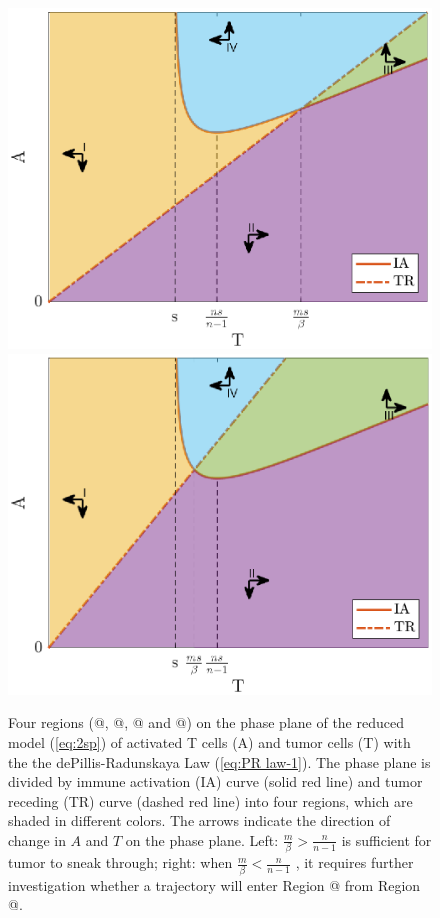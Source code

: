 \documentclass[review,authoryear]{elsarticle}
\makeatletter
\newcommand*{\rom}[1]{\expandafter\@slowromancap\romannumeral #1@}
\makeatother
\begin{document}
\begin{figure}
\centerline{\includegraphics[width=0.5\linewidth]{figs/dP-colored-regions-l}\includegraphics[width=0.5\linewidth]{figs/dP-colored-regions-r}}

\caption{\label{fig:dP-PP-4regions}
Four regions (\rom{1}, \rom{2}, \rom{3} and \rom{4}) on the phase plane of the reduced model (\ref{eq:2sp}) of activated T cells (A) and tumor cells (T) with the the dePillis-Radunskaya Law (\ref{eq:PR law-1}). The phase plane is divided by immune activation (IA) curve (solid red line) and tumor receding (TR) curve (dashed red line) into four regions, which are 
shaded in different colors. The arrows indicate the direction of change in $A$ and $T$ on the phase plane. Left: $\frac{m}{\beta}>\frac{n}{n-1}$
is sufficient for tumor to sneak through; right: when $\frac{m}{\beta}<\frac{n}{n-1}$
, it requires further investigation whether a trajectory will enter
Region \rom{3} from Region \rom{2}. }
\end{figure}
\end{document}

